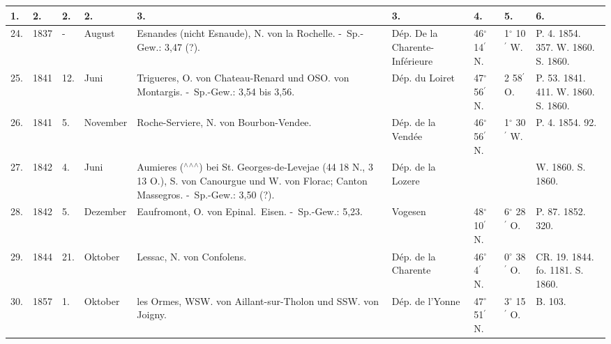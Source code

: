 \documentclass[a4paper, 8pt, oneside, polutonikogreek, german]{article}
\begin{document}
\begin{landscape}
\begin{table}[!ht]
    \centering
    \footnotesize
    \begin{tabular}{|p{5mm}|p{9mm}|p{5mm}|p{15mm}|p{48mm}|p{25mm}|l|l|p{11mm}|}
    \hline
        1. & 2. & 2. & 2. & 3. & 3. & 4. & 5. & 6. \\ \hline
        24. & 1837 & - & August & Esnandes (nicht Esnaude), N. von la Rochelle. - Sp.-Gew.: 3,47 (?). & Dép. De la Charente-Inférieure & 46$^\circ$ 14$^\prime$ N. & 1$^\circ$ 10$^\prime$ W. & P. 4. 1854. 357. W. 1860. S. 1860. \\ \hline
        25. & 1841 & 12. & Juni & Trigueres, O. von Chateau-Renard und OSO. von Montargis. - Sp.-Gew.: 3,54 bis 3,56. & Dép. du Loiret & 47$^\circ$ 56$^\prime$ N. & 2 58$^\prime$ O. & P. 53. 1841. 411. W. 1860. S. 1860. \\ \hline
        26. & 1841 & 5. & November & Roche-Serviere, N. von Bourbon-Vendee. & Dép. de la Vendée & 46$^\circ$ 56$^\prime$ N. & 1$^\circ$ 30$^\prime$ W. & P. 4. 1854. 92. \\ \hline
        27. & 1842 & 4. & Juni & Aumieres ($^\wedge$$^\wedge$$^\wedge$) bei St. Georges-de-Levejae (44 18 N., 3 13 O.), S. von Canourgue und W. von Florac; Canton Massegros. - Sp.-Gew.: 3,50 (?). & Dép. de la Lozere & ~ & ~ & W. 1860. S. 1860. \\ \hline
        28. & 1842 & 5. & Dezember & Eaufromont, O. von Epinal. Eisen. - Sp.-Gew.: 5,23. & Vogesen & 48$^\circ$ 10$^\prime$ N. & 6$^\circ$ 28$^\prime$ O. & P. 87. 1852. 320. \\ \hline
        29. & 1844 & 21. & Oktober & Lessac, N. von Confolens. & Dép. de la Charente & 46$^\circ$ 4$^\prime$ N. & 0$^\circ$ 38$^\prime$ O. & CR. 19. 1844. fo. 1181. S. 1860. \\ \hline
        30. & 1857 & 1. & Oktober & les Ormes, WSW. von Aillant-sur-Tholon und SSW. von Joigny. & Dép. de l’Yonne & 47$^\circ$ 51$^\prime$ N. & 3$^\circ$ 15$^\prime$ O. & B. 103. \\ \hline
    \end{tabular}
\end{table}
\end{landscape}
\clearpage
\end{document}
